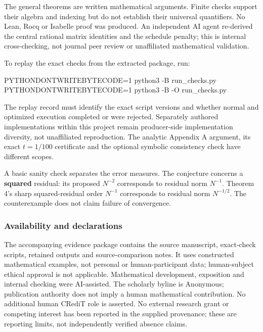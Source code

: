 \documentclass[
  british,
  11pt,
  a4paper,
]{article}
\newenvironment{Shaded}{}{}
\newcommand{\AttributeTok}[1]{\textcolor[rgb]{0.49,0.56,0.16}{#1}}
\newcommand{\ExtensionTok}[1]{#1}
\newcommand{\NormalTok}[1]{#1}
\newcommand{\OperatorTok}[1]{\textcolor[rgb]{0.40,0.40,0.40}{#1}}
\newcommand{\VariableTok}[1]{\textcolor[rgb]{0.10,0.09,0.49}{#1}}
\begin{document}
The general theorems are written mathematical arguments. Finite checks
support their algebra and indexing but do not establish their universal
quantifiers. No Lean, Rocq or Isabelle proof was produced. An
independent AI agent re-derived the central rational matrix identities
and the schedule penalty; this is internal cross-checking, not journal
peer review or unaffiliated mathematical validation.

To replay the exact checks from the extracted package, run:

\begin{Shaded}
\begin{Highlighting}[]
\VariableTok{PYTHONDONTWRITEBYTECODE}\OperatorTok{=}\NormalTok{1 }\ExtensionTok{python3} \AttributeTok{{-}B}\NormalTok{ run\_checks.py}
\VariableTok{PYTHONDONTWRITEBYTECODE}\OperatorTok{=}\NormalTok{1 }\ExtensionTok{python3} \AttributeTok{{-}B} \AttributeTok{{-}O}\NormalTok{ run\_checks.py}
\end{Highlighting}
\end{Shaded}

The replay record must identify the exact script versions and whether
normal and optimized execution completed or were rejected. Separately
authored implementations within this project remain producer-side
implementation diversity, not unaffiliated reproduction. The analytic
Appendix A argument, its exact \(t=1/100\) certificate and the optional
symbolic consistency check have different scopes.

A basic sanity check separates the error measures. The conjecture
concerns a \textbf{squared} residual: its proposed \(N^{-2}\)
corresponds to residual norm \(N^{-1}\). Theorem 4's sharp
squared-residual order \(N^{-1}\) corresponds to residual norm
\(N^{-1/2}\). The counterexample does not claim failure of convergence.

\subsubsection{Availability and
declarations}\label{availability-and-declarations}

The accompanying evidence package contains the source manuscript,
exact-check scripts, retained outputs and source-comparison notes. It
uses constructed mathematical examples, not personal or
human-participant data; human-subject ethical approval is not
applicable. Mathematical development, exposition and internal checking
were AI-assisted. The scholarly byline is Anonymous; publication
authority does not imply a human mathematical contribution. No
additional human CRediT role is asserted. No external research grant or
competing interest has been reported in the supplied provenance; these
are reporting limits, not independently verified absence claims.
\end{document}
